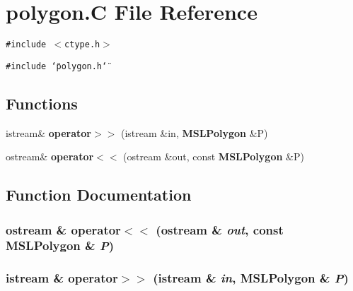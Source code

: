 \section{polygon.C File Reference}
\label{polygon_8C}
{\tt \#include $<$ctype.h$>$}\par
{\tt \#include \char`\"{}polygon.h\char`\"{}}\par
\subsection*{Functions}
\begin{CompactItemize}
\item 
istream\& {\bf operator$>$$>$} (istream \&in, {\bf MSLPolygon} \&P)
\item 
ostream\& {\bf operator$<$$<$} (ostream \&out, const {\bf MSLPolygon} \&P)
\end{CompactItemize}


\subsection{Function Documentation}
\subsubsection{\setlength{\rightskip}{0pt plus 5cm}ostream \& operator$<$$<$ (ostream \& {\em out}, const {\bf MSLPolygon} \& {\em P})}\label{polygon_8C_a1}


\subsubsection{\setlength{\rightskip}{0pt plus 5cm}istream \& operator$>$$>$ (istream \& {\em in}, {\bf MSLPolygon} \& {\em P})}\label{polygon_8C_a0}


